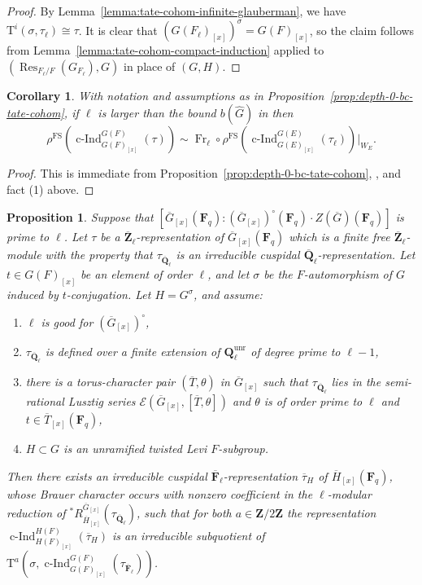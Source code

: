 \documentclass[reqno]{amsart}
\numberwithin{equation}{subsection}
\newcommand{\F}{\mathbf{F}}
\newcommand{\Q}{\mathbf{Q}}
\newcommand{\Z}{\mathbf{Z}}
\newcommand{\ol}[1]{\overline{#1}}
\newcommand{\wh}[1]{\widehat{#1}}
\newcommand\cE{\mathcal{E}}
\DeclareMathOperator{\unr}{unr}
\DeclareMathOperator{\Res}{Res}
\DeclareMathOperator{\FS}{FS}
\DeclareMathOperator{\cInd}{c-Ind}
\DeclareMathOperator{\Fr}{Fr}
\newcommand{\rT}{\ensuremath{\mathrm{T}}\xspace}
\newtheorem{prop}[thm]{Proposition}
\newtheorem{cor}[thm]{Corollary}
\theoremstyle{remark}
\numberwithin{equation}{subsection}
\numberwithin{figure}{subsection}
\begin{document}
\begin{proof}
    By Lemma~\ref{lemma:tate-cohom-infinite-glauberman}, we have $\rT^i(\sigma, \tau_\ell) \cong \tau$. It is clear that $(G(F_\ell)_{[x]})^\sigma = G(F)_{[x]}$, so the claim follows from Lemma~\ref{lemma:tate-cohom-compact-induction} applied to $(\Res_{F_\ell/F}(G_{F_\ell}), G)$ in place of $(G, H)$.
\end{proof}

\begin{cor}\label{cor:fs-depth-0-bc}
    With notation and assumptions as in Proposition~\ref{prop:depth-0-bc-tate-cohom}, if $\ell$ is larger than the bound $b(\wh G)$ in \cite[Theorem~1.3.1]{F24} then
    \[
    \rho^{\FS}(\cInd_{G(F)_{[x]}}^{G(F)}(\tau)) \sim \Fr_\ell \circ \rho^{\FS}(\cInd_{G(E)_{[x]}}^{G(E)}(\tau_\ell))|_{W_E}.
    \]
\end{cor}

\begin{proof}
    This is immediate from Proposition~\ref{prop:depth-0-bc-tate-cohom}, \cite[Theorem~1.3.1]{F24}, and fact (1) above.
\end{proof}

\begin{prop}\label{prop:depth-0-unram-levi-tate-cohom}
    Suppose that $[\ol G_{[x]}(\F_q): (\ol G_{[x]})^\circ(\F_q) \cdot Z(\ol G)(\F_q)]$ is prime to $\ell$. Let $\tau$ be a $\ol\Z_\ell$-representation of $\ol G_{[x]}(\F_q)$ which is a finite free $\ol\Z_\ell$-module with the property that $\tau_{\ol\Q_\ell}$ is an irreducible cuspidal $\ol\Q_\ell$-representation. Let $t \in G(F)_{[x]}$ be an element of order $\ell$, and let $\sigma$ be the $F$-automorphism of $G$ induced by $t$-conjugation. Let $H = G^\sigma$, and assume:
    \begin{enumerate}
        \item $\ell$ is good for $(\ol G_{[x]})^\circ$,
        \item $\tau_{\ol\Q_\ell}$ is defined over a finite extension of $\Q_\ell^{\unr}$ of degree prime to $\ell-1$,
        \item there is a torus-character pair $(\ol T, \theta)$ in $\ol G_{[x]}$ such that $\tau_{\ol\Q_\ell}$ lies in the semi-rational Lusztig series $\cE(\ol G_{[x]}, [\ol T, \theta])$ and $\theta$ is of order prime to $\ell$ and $t \in \ol T_{[x]}(\F_q)$,
        \item $H \subset G$ is an unramified twisted Levi $F$-subgroup.
    \end{enumerate}
    Then there exists an irreducible cuspidal $\ol\F_\ell$-representation $\ol\tau_H$ of $\ol H_{[x]}(\F_q)$, whose Brauer character occurs with nonzero coefficient in the $\ell$-modular reduction of ${}^*R^{\ol G_{[x]}}_{\ol H_{[x]}}(\tau_{\ol\Q_\ell})$, such that for both $a \in \Z/2\Z$ the representation $\cInd_{H(F)_{[x]}}^{H(F)}(\ol\tau_H)$ is an irreducible subquotient of $\rT^a(\sigma, \cInd_{G(F)_{[x]}}^{G(F)}(\tau_{\ol\F_\ell}))$.
\end{prop}
\end{document}
